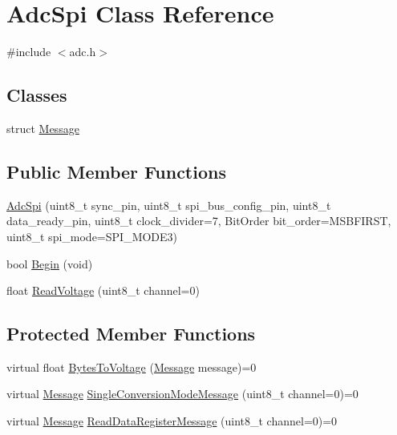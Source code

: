 \hypertarget{classAdcSpi}{}\section{Adc\+Spi Class Reference}
\label{classAdcSpi}


{\ttfamily \#include $<$adc.\+h$>$}

\subsection*{Classes}
\begin{DoxyCompactItemize}
\item 
struct \mbox{\hyperlink{structAdcSpi_1_1Message}{Message}}
\end{DoxyCompactItemize}
\subsection*{Public Member Functions}
\begin{DoxyCompactItemize}
\item 
\mbox{\hyperlink{classAdcSpi_a5b3afab7dc4a788e1caf6a1277b67df9}{Adc\+Spi}} (uint8\+\_\+t sync\+\_\+pin, uint8\+\_\+t spi\+\_\+bus\+\_\+config\+\_\+pin, uint8\+\_\+t data\+\_\+ready\+\_\+pin, uint8\+\_\+t clock\+\_\+divider=7, Bit\+Order bit\+\_\+order=M\+S\+B\+F\+I\+R\+ST, uint8\+\_\+t spi\+\_\+mode=S\+P\+I\+\_\+\+M\+O\+D\+E3)
\item 
bool \mbox{\hyperlink{classAdcSpi_aa8f8f27578dd85cfcdbc9439bbce66cb}{Begin}} (void)
\item 
float \mbox{\hyperlink{classAdcSpi_aa245df90e70654aabc64f88107ccd804}{Read\+Voltage}} (uint8\+\_\+t channel=0)
\end{DoxyCompactItemize}
\subsection*{Protected Member Functions}
\begin{DoxyCompactItemize}
\item 
virtual float \mbox{\hyperlink{classAdcSpi_aa9970471c6fc505e4b91ac6985ac1489}{Bytes\+To\+Voltage}} (\mbox{\hyperlink{structAdcSpi_1_1Message}{Message}} message)=0
\item 
virtual \mbox{\hyperlink{structAdcSpi_1_1Message}{Message}} \mbox{\hyperlink{classAdcSpi_ac6a6421e3045c986c6997019a04d11ea}{Single\+Conversion\+Mode\+Message}} (uint8\+\_\+t channel=0)=0
\item 
virtual \mbox{\hyperlink{structAdcSpi_1_1Message}{Message}} \mbox{\hyperlink{classAdcSpi_acd92eec341ed010e5b7569ffcbba811d}{Read\+Data\+Register\+Message}} (uint8\+\_\+t channel=0)=0
\end{DoxyCompactItemize}


